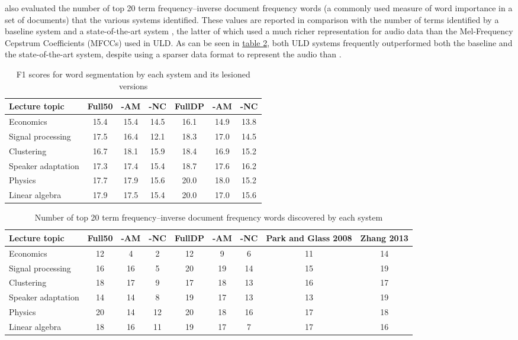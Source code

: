 \documentclass[12pt,letterpaper]{article}
\begin{document}
 \citet{lee:2015} also evaluated the number of top 20 term frequency–inverse document frequency words (a commonly used measure of word importance in a set of documents) that the various systems identified. These values are reported in comparison with the number of terms identified by a baseline system \citep{park:2008} and a state-of-the-art system \citep{zhang:2013}, the latter of which used a much richer representation for audio data than the Mel-Frequency Cepstrum Coefficients (MFCCs) used in ULD. As can be seen in  \hyperref[table3]{table \ref*{table3}}, both ULD systems frequently outperformed both the baseline and the state-of-the-art system, despite using a sparser data format to represent the audio than \citet{zhang:2013}. 


\begin{table}
\begin{tabular}{|l||c|c|c||c|c|c|}
\hline
Lecture topic&Full50&-AM&-NC&FullDP&-AM&-NC \\
\hline \hline
Economics&15.4&15.4&14.5&16.1&14.9&13.8\\
\hline
Signal processing&17.5&16.4&12.1&18.3&17.0&14.5\\
\hline
Clustering&16.7&18.1&15.9&18.4&16.9&15.2\\
\hline
Speaker adaptation&17.3&17.4&15.4&18.7&17.6&16.2\\
\hline
Physics&17.7&17.9&15.6&20.0&18.0&15.2\\
\hline
Linear algebra&17.9&17.5&15.4&20.0&17.0&15.6\\
\hline

\end{tabular}
\caption{F1 scores for word segmentation by each system and its lesioned versions}
\label{table2}
\end{table}

\begin{table}
\begin{tabular}{|l||c|c|c||c|c|c||c|c|}
\hline
Lecture topic&Full50&-AM&-NC&FullDP&-AM&-NC&Park and Glass 2008&Zhang 2013\\
\hline \hline
Economics&12&4&2&12&9&6&11&14\\
\hline
Signal processing&16&16&5&20&19&14&15&19\\
\hline
Clustering&18&17&9&17&18&13&16&17\\
\hline
Speaker adaptation&14&14&8&19&17&13&13&19\\
\hline
Physics&20&14&12&20&18&16&17&18\\
\hline
Linear algebra&18&16&11&19&17&7&17&16\\
\hline
\end{tabular}
\caption{Number of top 20 term frequency–inverse document frequency words discovered by each system}
\label{table3}
\end{table}
\end{document}
